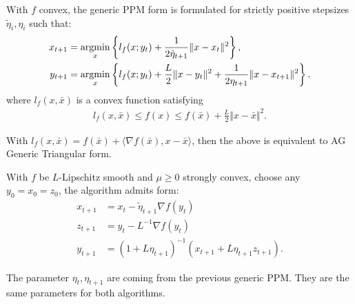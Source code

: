 \documentclass[12pt]{article}
\begin{document}
        \begin{definition}\label{def:agg_ppm}
            With $f$ convex, the generic PPM form is formulated for strictly positive stepsizes $\tilde \eta_i,\eta_i$ such that: 
            \begin{align*}
                x_{t + 1} &= \mathop{\rm argmin}\limits_{x} \left\lbrace
                l_f(x; y_t) + \frac{1}{2\tilde \eta_{t + 1}} \Vert x - x_t\Vert^2
                \right\rbrace, 
                \\
                y_{t + 1} &= \mathop{\rm argmin}\limits_{x} 
                \left\lbrace
                    l_f(x; y_t) + \frac{L}{2}\Vert x - y_t\Vert^2 + 
                    \frac{1}{2\eta_{t + 1}}\Vert x - x_{t + 1}\Vert^2
                \right\rbrace. 
            \end{align*}
            where $l_f(x, \bar x)$ is a convex function satisfying
            \begin{align*}
                l_f(x, \bar x) \le f(x) \le f(\bar x) + \frac{L}{2}\Vert x - \bar x\Vert^2. 
            \end{align*}
        \end{definition}
        \begin{remark}
            With $l_f(x, \bar x) = f(\bar x) + \langle \nabla f(\bar x), x - \bar x\rangle$, then the above is equivalent to AG Generic Triangular form. 
        \end{remark}

        \begin{definition}\label{def:agg_tri}
            With $f$ be $L$-Lipschitz smooth and $\mu \ge 0$  strongly convex, choose any $y_0 = x_0=z_0$, the algorithm admits form: 
            \begin{align*}
                x_{t + 1} &= x_t - \tilde \eta_{t + 1} \nabla f(y_t) 
                \\
                z_{t + 1} &= y_t - L^{-1} \nabla f(y_t) 
                \\
                y_{t + 1} &= 
                (1 + L\eta_{t + 1})^{-1}
                (
                x_{t + 1} + L\eta_{t + 1}z_{t + 1}
                ). 
            \end{align*}
        \end{definition}
        \begin{remark}
            The parameter $\eta_t, \eta_{t + 1}$ are coming from the previous generic PPM. 
            They are the same parameters for both algorithms. 
        \end{remark}
        
\end{document}
